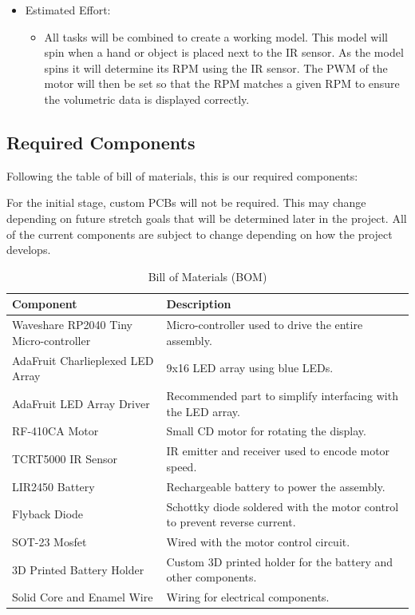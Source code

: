 \documentclass[11pt,journal]{IEEEtran}
\begin{document}
\begin{enumerate}
\begin{itemize}
        \item Estimated Effort:
        \begin{itemize}
            \item All tasks will be combined to create a working model. This model will spin when a hand or object is placed next to the IR sensor. As the model spins it will determine its RPM using the IR sensor. The PWM of the motor will then be set so that the RPM matches a given RPM to ensure the volumetric data is displayed correctly.
        \end{itemize}
    \end{itemize}
\end{enumerate}



\subsection{Required Components}

Following the table of bill of materials, this is our required components:

For the initial stage, custom PCBs will not be required. This may change depending on future stretch goals that will be determined later in the project. All of the current components are subject to change depending on how the project develops.

\begin{table}[h]
\centering
\caption{Bill of Materials (BOM)}
\begin{tabular}{|p{3cm}|p{5cm}|}
\hline
\textbf{Component} & \textbf{Description} \\
\hline
Waveshare RP2040 Tiny Micro-controller & Micro-controller used to drive the entire assembly. \\
\hline
AdaFruit Charlieplexed LED Array & 9x16 LED array using blue LEDs. \\
\hline
AdaFruit LED Array Driver & Recommended part to simplify interfacing with the LED array. \\
\hline
RF-410CA Motor & Small CD motor for rotating the display. \\
\hline
TCRT5000 IR Sensor & IR emitter and receiver used to encode motor speed. \\
\hline
LIR2450 Battery & Rechargeable battery to power the assembly. \\
\hline
Flyback Diode & Schottky diode soldered with the motor control to prevent reverse current. \\
\hline
SOT-23 Mosfet & Wired with the motor control circuit. \\
\hline
3D Printed Battery Holder & Custom 3D printed holder for the battery and other components. \\
\hline
Solid Core and Enamel Wire & Wiring for electrical components. \\
\hline
\end{tabular}

\end{table}
\end{document}
